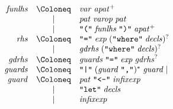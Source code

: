 \begin{align*}
  \begin{array}{rcl}
    \mathit{funlhs}
    & \Coloneq & \mathit{var}\; \mathit{apat}^+ \\
    & \mid & \mathit{pat}\; \mathit{varop}\; \mathit{pat} \\
    & \mid & \text{\texttt{\textquotedbl(\textquotedbl}}\; \mathit{funlhs}\; \text{\texttt{\textquotedbl)\textquotedbl}}\; \mathit{apat}^+ \\
    \mathit{rhs}
    & \Coloneq & \text{\texttt{\textquotedbl =\textquotedbl}}\; \mathit{exp}\; (\text{\texttt{\textquotedbl where\textquotedbl}}\; \mathit{decls})^? \\
    & \mid & \mathit{gdrhs}\; (\text{\texttt{\textquotedbl where\textquotedbl}}\; \mathit{decls})^? \\
    \mathit{gdrhs}
    & \Coloneq & \mathit{guards}\; \text{\texttt{\textquotedbl =\textquotedbl}}\; \mathit{exp}\; \mathit{gdrhs}^? \\
    \mathit{guards}
    & \Coloneq & \text{\texttt{\textquotedbl |\textquotedbl}}\; (\mathit{guard}\; \text{\texttt{\textquotedbl ,\textquotedbl}})^*\; \mathit{guard} \mid \\
    \mathit{guard}
    & \Coloneq & \mathit{pat}\; \text{\texttt{\textquotedbl <-\textquotedbl}}\; \mathit{infixexp} \\
    & \mid & \text{\texttt{\textquotedbl let\textquotedbl}}\; \mathit{decls} \\
    & \mid & \mathit{infixexp}
  \end{array}
\end{align*}

